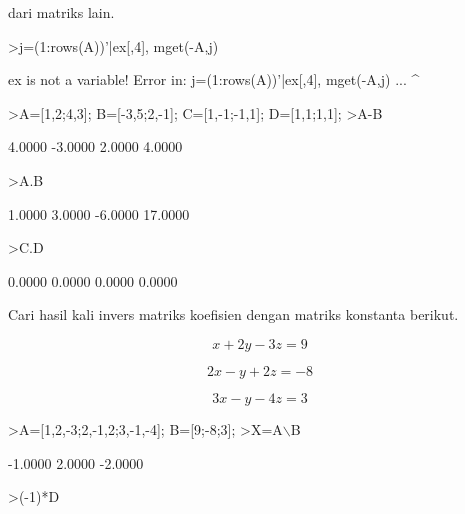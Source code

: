\documentclass{article}
\begin{document}
\begin{eulernotebook}
\begin{eulercomment}
dari matriks lain.
\end{eulercomment}
\begin{eulerprompt}
>j=(1:rows(A))'|ex[,4], mget(-A,j)
\end{eulerprompt}
\begin{euleroutput}
  ex is not a variable!
  Error in:
  j=(1:rows(A))'|ex[,4], mget(-A,j) ...
                       ^
\end{euleroutput}
\begin{eulerprompt}
>A=[1,2;4,3]; B=[-3,5;2,-1]; C=[1,-1;-1,1]; D=[1,1;1,1];
>A-B
\end{eulerprompt}
\begin{euleroutput}
       4.0000     -3.0000 
       2.0000      4.0000 
\end{euleroutput}
\begin{eulerprompt}
>A.B
\end{eulerprompt}
\begin{euleroutput}
       1.0000      3.0000 
      -6.0000     17.0000 
\end{euleroutput}
\begin{eulerprompt}
>C.D
\end{eulerprompt}
\begin{euleroutput}
       0.0000      0.0000 
       0.0000      0.0000 
\end{euleroutput}
\begin{eulercomment}
Cari hasil kali invers matriks koefisien dengan matriks konstanta
berikut.\\
\end{eulercomment}
\begin{eulerformula}
\[
x+2y-3z=9
\]
\end{eulerformula}
\begin{eulerformula}
\[
2x-y+2z=-8
\]
\end{eulerformula}
\begin{eulerformula}
\[
3x-y-4z=3
\]
\end{eulerformula}
\begin{eulerprompt}
>A=[1,2,-3;2,-1,2;3,-1,-4]; B=[9;-8;3];
>X=A\(\backslash\)B
\end{eulerprompt}
\begin{euleroutput}
      -1.0000 
       2.0000 
      -2.0000 
\end{euleroutput}
\begin{eulerprompt}
>(-1)*D
\end{eulerprompt}
\begin{euleroutput}

\end{euleroutput}
\end{eulernotebook}
\end{document}
